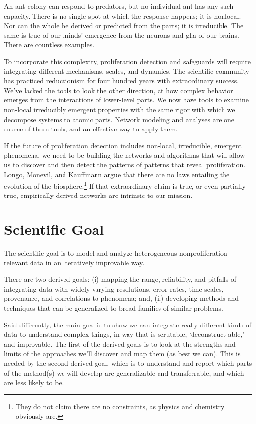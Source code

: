 \documentclass{article} %
\begin{document}
An ant colony can respond to predators, but no individual ant has any such capacity. There is no single spot at which the response happens; it is nonlocal. Nor can the whole be derived or predicted from the parts; it is irreducible. The same is true of our minds' emergence from the neurons and glia of our brains. There are countless examples.  

To incorporate this complexity, proliferation detection and safeguards will require integrating different mechanisms, scales, and dynamics. The scientific community has practiced reductionism for four hundred years with extraordinary success. We've lacked the tools to look the other direction, at how complex behavior emerges from the interactions of lower-level parts. We now have tools to examine non-local irreducibly emergent properties with the same rigor with which we decompose systems to atomic parts. Network modeling and analyses are one source of those tools, and an effective way to apply them.

If the future of proliferation detection includes non-local, irreducible, emergent phenomena, we need to be building the networks and algorithms that will allow us to discover and then detect the patterns of patterns that  reveal proliferation. Longo, Monevil, and Kauffmann argue that there are no laws entailing the evolution of the biosphere.\footnote{They do not claim there are no constraints, as physics and chemistry obviously are.} If that extraordinary claim is true, or even partially true, empirically-derived networks are intrinsic to our mission.

\pagebreak
\section{Scientific Goal}
The scientific goal is to model and analyze heterogeneous nonproliferation-relevant data in an iteratively improvable way. 

There are two derived goals: (i) mapping the range, reliability, and pitfalls of integrating data with widely varying resolutions, error rates, time scales, provenance, and correlations to phenomena; and, (ii) developing methods and techniques that can be generalized to broad families of similar problems.

Said differently, the main goal is to show we can integrate really different kinds of data to understand complex things, in way that is scrutable, `deconstruct-able,' and improvable. The first of the derived goals is to look at the strengths and limits of the approaches we'll discover and map them (as best we can). This is needed by the second derived goal, which is to understand and report which parts of the method(s) we will develop are generalizable and transferrable, and which are less likely to be.
\end{document}
